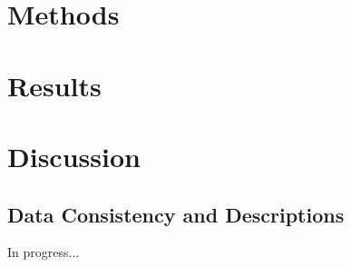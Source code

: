 \documentclass[11pt]{article}
\begin{document}
\begin{spacing}{1.5}
  
  
  
  
  

  
  \clearpage
  \section{Methods}

  \clearpage
  \section{Results}

  \clearpage
  \section{Discussion}

  \clearpage
  
  
  \clearpage
  \begin{appendices}
  \setcounter{page}{1}
  \renewcommand{\thepage}{A\arabic{page}}
  \setcounter{table}{0}
  \renewcommand{\thetable}{A\arabic{table}}
  \setcounter{figure}{0}
  \renewcommand{\thefigure}{A\arabic{figure}}



  \section{Data Consistency and Descriptions}
  \label{app:data}
  In progress...



\end{appendices}
\end{spacing}
\end{document}
